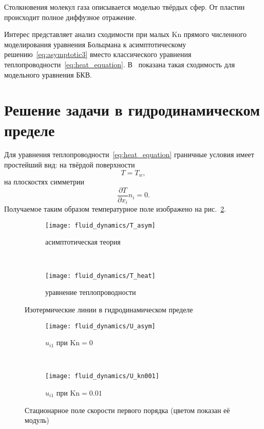 \documentclass[english,russian,a4paper,12pt]{article}
\newcommand{\Kn}{\mathrm{Kn}}
\newcommand{\pder}[2][]{\frac{\partial#1}{\partial#2}}
\begin{document}
Столкновения молекул газа описывается моделью твёрдых сфер. От пластин происходит полное диффузное отражение. 

Интерес представляет анализ сходимости при малых \(\Kn\) прямого численного моделирования уравнения Больцмана
к асимптотическому решению~\eqref{eq:asymptotic3} вместо классического уравнения теплопроводности~\eqref{eq:heat_equation}.
В~\cite{Bobylev1996} показана такая сходимость для модельного уравнения БКВ.

\section{Решение задачи в гидродинамическом пределе}

Для уравнения теплопроводности~\eqref{eq:heat_equation} граничные условия имеет простейший вид:
на твёрдой поверхности
\[ T = T_w, \]
на плоскостях симметрии
\[ \pder[T]{x_i}n_i = 0. \]
Получаемое таким образом температурное поле изображено на рис.~\ref{fig:isotemp:heat}.

\begin{figure}[ht]
	\centering
	\begin{subfigure}{0.45\textwidth}
		\centering
		\texttt{[image: fluid\_dynamics/T\_asym]}
		\caption{асимптотическая теория}
		\label{fig:isotemp:asym}
	\end{subfigure}
	~
	\begin{subfigure}{0.45\textwidth}
		\centering
		\texttt{[image: fluid\_dynamics/T\_heat]}
		\caption{уравнение теплопроводности}
		\label{fig:isotemp:heat}
	\end{subfigure}
	\caption{Изотермические линии в гидродинамическом пределе}\label{fig:isotemp}
\end{figure}

\begin{figure}[ht]
	\centering
	\begin{subfigure}{0.48\textwidth}
		\centering
		\texttt{[image: fluid\_dynamics/U\_asym]}
		\caption{\(u_{i1}\) при \(\Kn=0\)}\label{fig:velocity:asym}
	\end{subfigure}
	~
	\begin{subfigure}{0.48\textwidth}
		\centering
		\texttt{[image: fluid\_dynamics/U\_kn001]}
		\caption{\(u_{i1}\) при \(\Kn=0.01\) }\label{fig:velocity:asym_kn001}
	\end{subfigure}
	\caption{Стационарное поле скорости первого порядка (цветом показан её модуль)}\label{fig:velocity}
\end{figure}
\end{document}

